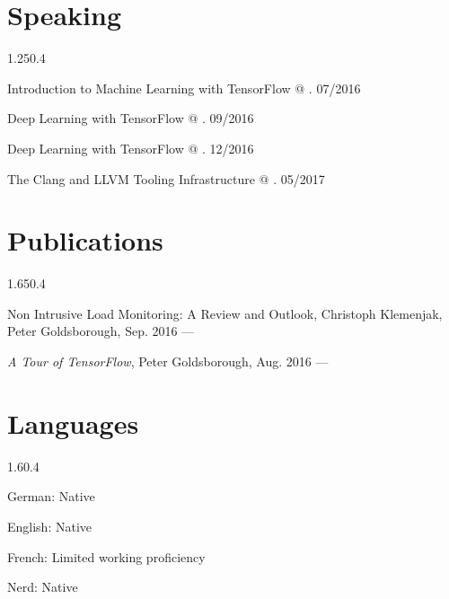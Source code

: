 \vspace{-0.25cm}
\section{Speaking}{1.25}{0.4}
\begin{simpleentry}
  \item Introduction to Machine Learning with TensorFlow @ . \hspace{3cm} 07/2016
  \item Deep Learning with TensorFlow @ . \hspace{7.65cm} 09/2016
  \item Deep Learning with TensorFlow @ . \hspace{6.95cm} 12/2016
  \item The Clang and LLVM Tooling Infrastructure @ . \hspace{6.37cm} 05/2017
\end{simpleentry}

\vspace{-0.25cm}
\section{Publications}{1.65}{0.4}
\begin{simpleentry}
  \item Non Intrusive Load Monitoring: A Review and Outlook, Christoph Klemenjak, Peter Goldsborough, Sep. 2016 --- 
  \item \emph{A Tour of TensorFlow}, Peter Goldsborough, Aug. 2016 --- 
\end{simpleentry}

\section{Languages}{1.6}{0.4}
\begin{simpleentry}
  \item German: Native
  \item English: Native
  \item French: Limited working proficiency
  \item Nerd: Native
\end{simpleentry}

